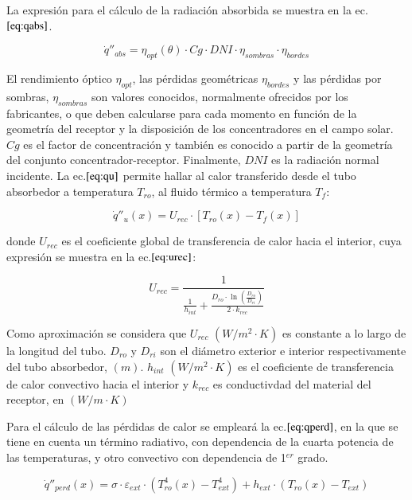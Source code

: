La expresión para el cálculo de la radiación absorbida se muestra en la ec.\(\eqref{eq:qabs}\). 

\begin{equation}
    \dot q''_{abs}= \eta_{opt}(\theta) \cdot Cg \cdot DNI \cdot \eta_{sombras} \cdot \eta_{bordes} \label{eq:qabs}
\end{equation}

El rendimiento óptico \(\eta_{opt}\), las pérdidas geométricas \(\eta_{bordes}\) y las pérdidas por sombras, \(\eta_{sombras}\) son valores conocidos, normalmente ofrecidos por los fabricantes, o que deben calcularse para cada momento en función de la geometría del receptor y la disposición de los concentradores en el campo solar. \(Cg\) es el factor de concentración y también es conocido a partir de la geometría del conjunto concentrador-receptor. Finalmente, \(DNI\) es la radiación normal incidente. La ec.\(\eqref{eq:qu}\) permite hallar al calor transferido desde el tubo absorbedor a temperatura \(T_{ro}\), al fluido térmico a temperatura \(T_{f}\):

\begin{equation}
    \dot q''_{u}(x)= U_{rec} \cdot [T_{ro}(x)-T_{f}(x)] \label{eq:qu}
\end{equation}

donde \(U_{rec}\) es el coeficiente global de transferencia de calor hacia el interior, cuya expresión se muestra en la ec.\(\eqref{eq:urec}\):

\begin{equation}
    U_{rec} = \frac{1}{\frac{1}{h_{int}} + \frac{D_{ro}\cdot \ln (\frac{D_{ro}}{D_{ri}})}{2\cdot k_{rec}}} \label{eq:urec}
\end{equation}

Como aproximación se considera que \(U_{rec}\) \((W/m^{2}\cdot K)\) es constante a lo largo de la longitud del tubo. \(D_{ro}\) y \(D_{ri}\) son el diámetro exterior e interior respectivamente del tubo absorbedor,  \((m)\). \(h_{int}\) \((W/m^{2}\cdot K)\) es el coeficiente de transferencia de calor convectivo hacia el interior  y \(k_{rec}\) es conductivdad del material del receptor, en \((W/m\cdot K)\)

Para el cálculo de las pérdidas de calor se empleará la ec.\(\eqref{eq:qperd}\), en la que se tiene en cuenta un término radiativo, con dependencia de  la cuarta potencia de las temperaturas, y otro convectivo con dependencia de 1$^{er}$ grado. 

\begin{equation}
    \dot q''_{perd}(x)= \sigma \cdot \varepsilon_{ext} \cdot (T_{ro}^{4}(x)-T_{ext}^{4}) + h_{ext} \cdot (T_{ro}(x)-T_{ext}) \label{eq:qperd}
\end{equation}

